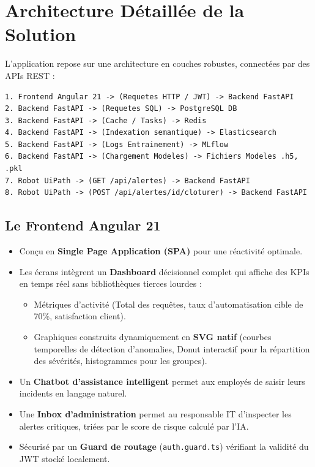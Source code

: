 \documentclass[11pt,a4paper]{article}
\begin{document}
\section{Architecture Détaillée de la Solution}

L'application repose sur une architecture en couches robustes, connectées par des APIs REST :

\begin{lstlisting}[caption={Flux de communication de l'architecture}]
1. Frontend Angular 21 -> (Requetes HTTP / JWT) -> Backend FastAPI
2. Backend FastAPI -> (Requetes SQL) -> PostgreSQL DB
3. Backend FastAPI -> (Cache / Tasks) -> Redis
4. Backend FastAPI -> (Indexation semantique) -> Elasticsearch
5. Backend FastAPI -> (Logs Entrainement) -> MLflow
6. Backend FastAPI -> (Chargement Modeles) -> Fichiers Modeles .h5, .pkl
7. Robot UiPath -> (GET /api/alertes) -> Backend FastAPI
8. Robot UiPath -> (POST /api/alertes/id/cloturer) -> Backend FastAPI
\end{lstlisting}

\subsection{Le Frontend Angular 21}
\begin{itemize}
    \item Conçu en \textbf{Single Page Application (SPA)} pour une réactivité optimale.
    \item Les écrans intègrent un \textbf{Dashboard} décisionnel complet qui affiche des KPIs en temps réel sans bibliothèques tierces lourdes :
    \begin{itemize}
        \item Métriques d'activité (Total des requêtes, taux d'automatisation cible de 70\%, satisfaction client).
        \item Graphiques construits dynamiquement en \textbf{SVG natif} (courbes temporelles de détection d'anomalies, Donut interactif pour la répartition des sévérités, histogrammes pour les groupes).
    \end{itemize}
    \item Un \textbf{Chatbot d'assistance intelligent} permet aux employés de saisir leurs incidents en langage naturel.
    \item Une \textbf{Inbox d'administration} permet au responsable IT d'inspecter les alertes critiques, triées par le score de risque calculé par l'IA.
    \item Sécurisé par un \textbf{Guard de routage} (\texttt{auth.guard.ts}) vérifiant la validité du JWT stocké localement.
\end{itemize}
\end{document}
